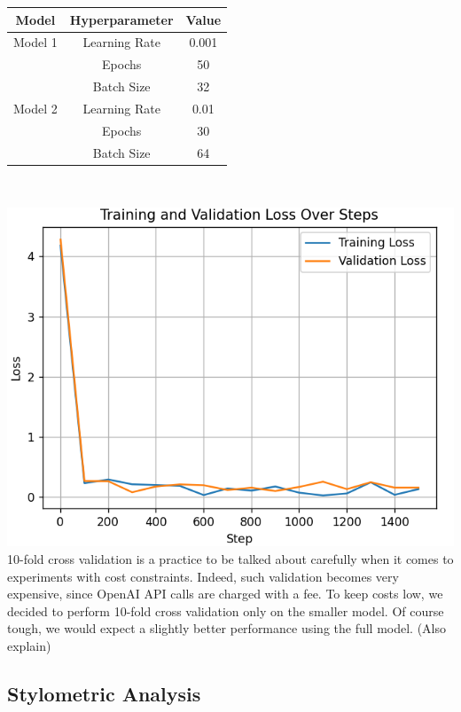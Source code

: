 \documentclass[10pt,twocolumn,letterpaper]{article}
\begin{document}
\begin{center}

    \begin{tabular}{ccc}
        \toprule
        Model & Hyperparameter & Value \\
        \midrule
        Model 1 & Learning Rate & 0.001 \\
        & Epochs & 50 \\
        & Batch Size & 32 \\
        \midrule
        Model 2 & Learning Rate & 0.01 \\
        & Epochs & 30 \\
        & Batch Size & 64 \\
        \bottomrule
    \end{tabular} \\

\end{center}

\includegraphics*[scale=0.55]{img/training_loss.png} \\


10-fold cross validation is a practice to be talked about carefully when it comes to experiments with cost constraints.
Indeed, such validation becomes very expensive, since OpenAI API calls are charged with a fee.
To keep costs low, we decided to perform 10-fold cross validation only on
the smaller model. Of course tough, we would expect a slightly better performance using the full model. (Also explain)

\subsection{Stylometric Analysis}
\end{document}
